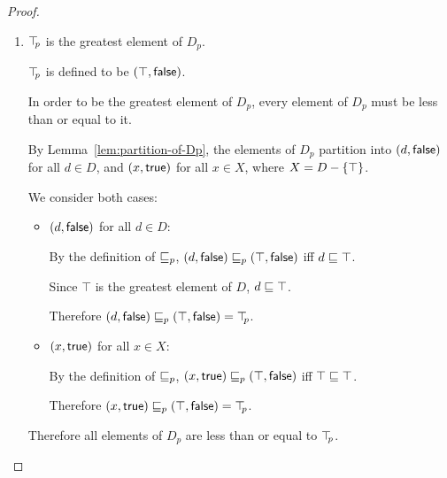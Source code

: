 \begin{proof}
\begin{enumerate}
  \item $\top\hspace{-0.85mm}_{p}$ is the greatest element of $D_p$.

    $\top\hspace{-0.85mm}_{p}$ is defined to be $(\top, \textsf{false})$.

    In order to be the greatest element of $D_p$, every element of
    $D_p$ must be less than or equal to it.

    By Lemma~\ref{lem:partition-of-Dp}, the elements of $D_p$
    partition into $(d, \textsf{false})$ for all $d \in D$, and
    $(x, \textsf{true})$ for all $x \in X$, where $X = D -
    \left\{\top\right\}$.

    We consider both cases:

    \begin{itemize}
    \item $(d, \textsf{false})$ for all $d \in D$:

      By the definition of $\sqsubseteq_p$, $(d, \textsf{false}) \sqsubseteq_p
      (\top, \textsf{false})$ iff $d \sqsubseteq \top$.

      Since $\top$ is the greatest element of $D$, $d \sqsubseteq \top$.

      Therefore $(d, \textsf{false}) \sqsubseteq_p
      (\top, \textsf{false}) = \top\hspace{-0.85mm}_{p}$.

    \item $(x, \textsf{true})$ for all $x \in X$:

      By the definition of $\sqsubseteq_p$, $(x, \textsf{true}) \sqsubseteq_p
      (\top, \textsf{false})$ iff $\top \sqsubseteq \top$.

      Therefore $(x, \textsf{true}) \sqsubseteq_p
      (\top, \textsf{false}) = \top\hspace{-0.85mm}_{p}$.

    \end{itemize}

    Therefore all elements of $D_p$ are less than or equal to $\top\hspace{-0.85mm}_{p}$.
  \end{enumerate}
\end{proof}
